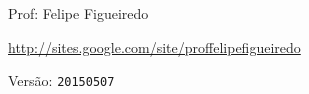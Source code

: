 \documentclass[a4paper]{article}
\begin{document}
\parbox[c]{.825\textwidth}{\raggedright%
{Prof: Felipe Figueiredo\par}
{\url{http://sites.google.com/site/proffelipefigueiredo}\par}
}

Versão: \verb|20150507|



\section{}


\section{}
\end{document}
